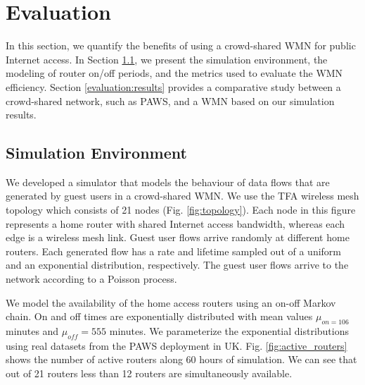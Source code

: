 \section{Evaluation}
\label{sec:evaluation}

In this section, we quantify the benefits of using a crowd-shared WMN for public Internet access. In Section \ref{evaluation:environment}, we present the simulation environment, the modeling of router on/off periods, and the metrics used to evaluate the WMN efficiency. Section \ref{evaluation:results} provides a comparative study between a crowd-shared network, such as PAWS, and a WMN based on our simulation results.

\subsection{Simulation Environment}
\label{evaluation:environment}


We developed a simulator that models the behaviour of data flows that are generated by guest users in a crowd-shared WMN. We use the TFA wireless mesh topology \cite{TFA} which consists of 21 nodes (Fig. \ref{fig:topology}). Each node in this figure represents a home router with shared Internet access bandwidth, whereas each edge is a wireless mesh link. Guest user flows arrive randomly at different home routers. Each generated flow has a rate and lifetime sampled out of a uniform and an exponential distribution, respectively. The guest user flows arrive to the network according to a Poisson process.

We model the availability of the home access routers using an on-off Markov chain. On and off times are exponentially distributed with mean values $\mu_{on = 106}$ minutes and $\mu_{off} = 555$ minutes. We parameterize the exponential distributions using real datasets from the PAWS deployment in UK. Fig. \ref{fig:active_routers} shows the number of active routers along 60 hours of simulation. We can see that out of 21 routers less than 12 routers are simultaneously available.

